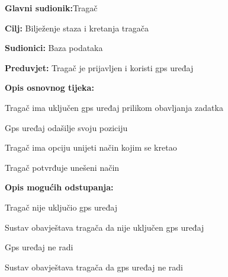 				
				\noindent {}
				\begin{packed_item}
					
					\item \textbf{Glavni sudionik:}Tragač
					\item  \textbf{Cilj:} Bilježenje staza i kretanja tragača
					\item  \textbf{Sudionici:} Baza podataka
					\item  \textbf{Preduvjet:} Tragač je prijavljen i koristi gps uređaj
					\item  \textbf{Opis osnovnog tijeka:}
					
					\item[] \begin{packed_enum}
						
						\item Tragač ima uključen gps uređaj prilikom obavljanja zadatka
						\item Gps uređaj odašilje svoju poziciju
						\item Tragač ima opciju unijeti način kojim se kretao
						\item Tragač potvrđuje unešeni način
						
					\end{packed_enum}
					
					\item  \textbf{Opis mogućih odstupanja:}
					
					\item[] \begin{packed_item}
						
						\item[1.a] Tragač nije uključio gps uređaj
						\item[] \begin{packed_enum}
							
							\item Sustav obavještava tragača da nije uključen gps uređaj
							
						\end{packed_enum}
						
						\item[2.a] Gps uređaj ne radi
						\item[] \begin{packed_enum}
							
							\item Sustav obavještava tragača da gps uređaj ne radi
							

\end{packed_enum}
\end{packed_item}
\end{packed_item}
